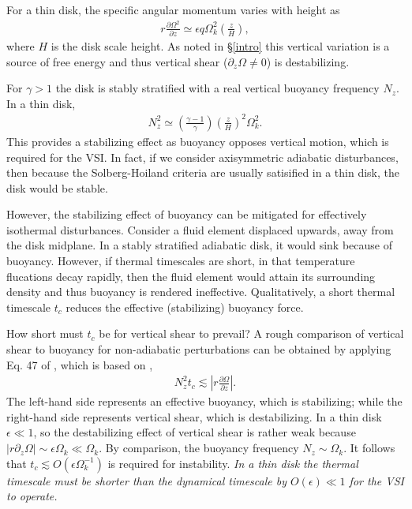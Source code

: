 \documentclass[iop]{emulateapj}
\newcommand{\p}{\partial}
\begin{document}
For a thin disk, the specific angular momentum varies with height as 
\begin{align}\label{vshear_thin}
  r \frac{\p \Omega^2 }{\p z} \simeq \epsilon q \Omega_k^2\left(\frac{z}{H}\right),
\end{align}
where $H$ is the disk scale height. As noted in
\S\ref{intro} this vertical variation is a source of free energy and
thus vertical shear ($\p_z\Omega \neq0$) is destabilizing. 

For $\gamma>1$ the disk is stably stratified with a real vertical
buoyancy frequency $N_z$.  In a thin disk,     
\begin{align}\label{nz_thin}
  N_z^2 \simeq \left(\frac{\gamma-1}{\gamma}\right) \left(\frac{z}{H}\right)^2
  \Omega_k^2.  
\end{align}
This provides a stabilizing effect as buoyancy opposes vertical
motion, which is required for the VSI. In fact, if we consider
axisymmetric adiabatic disturbances, then because the 
Solberg-Hoiland criteria \citep{tassoul78} are usually satisified in a
thin disk, the disk would be stable. 

However, the stabilizing effect of buoyancy can be mitigated for 
effectively isothermal disturbances. Consider a fluid element displaced upwards, away from
the disk midplane. In a stably stratified adiabatic disk, it would
sink because of buoyancy. However, if thermal timescales are short, in
that temperature flucations decay rapidly, then the fluid element would attain its surrounding 
density and  
thus buoyancy is rendered ineffective. Qualitatively, a short thermal
timescale $t_c$ reduces the effective (stabilizing) buoyancy force.    

How short must $t_c$ be for vertical shear to prevail? A rough 
comparison of vertical shear to buoyancy for non-adiabatic
perturbations can be obtained by applying Eq. 47 of \cite{urpin03}, which is based on 
\cite{townsend58},   
\begin{align}\label{bcrit_est}
  N_z^2 t_c \lesssim \left|r\frac{\p\Omega}{\p z}\right|. 
\end{align}
The left-hand side represents an effective buoyancy, which is
stabilizing; while the right-hand side represents vertical shear,
which is destabilizing. In a thin disk $\epsilon \ll 1$, so the destabilizing effect of 
vertical shear is rather weak because $|r\p_z\Omega|\sim\epsilon\Omega_k
\ll \Omega_k$. By comparison, the buoyancy frequency $N_z\sim
\Omega_k$. It follows that $t_c\lesssim O(\epsilon\Omega_k^{-1})$ is
required for instability.  \emph{In a thin  
  disk the thermal timescale must be shorter than the dynamical
  timescale by $O(\epsilon)\ll 1$ for the VSI to operate.}   
\end{document}
